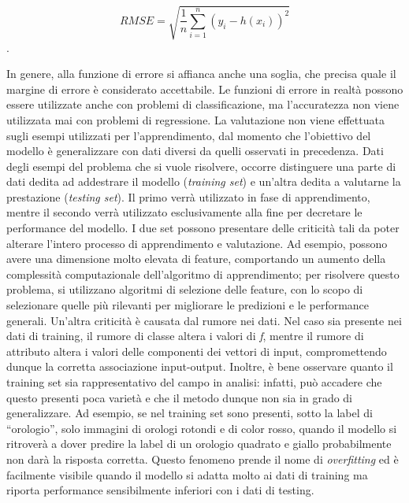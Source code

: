\documentclass[11pt,  oneside, openany]{book}
\begin{document}
$$RMSE = \sqrt{\frac{1}{n}\sum_{i=1}^{n}(y_{i} - h(x_{i}))^{2}}$$. 

In genere, alla funzione di errore si affianca anche una soglia, che precisa quale il margine di errore è considerato accettabile. Le funzioni di errore in realtà  possono essere utilizzate anche con problemi di classificazione, ma l'accuratezza non viene utilizzata mai con problemi di regressione. 
La valutazione non viene effettuata sugli esempi utilizzati per l'apprendimento, dal momento che l'obiettivo del modello è generalizzare con dati diversi da quelli osservati in precedenza. Dati degli esempi del problema che si vuole risolvere, occorre distinguere una parte di dati dedita ad addestrare il modello (\textit{training set}) e un'altra dedita a valutarne la prestazione (\textit{testing set}). Il primo verrà utilizzato in fase di apprendimento, mentre il secondo verrà utilizzato esclusivamente alla fine per decretare le performance del modello. I due set possono presentare delle criticità tali da poter alterare l'intero processo di apprendimento e valutazione. Ad esempio, possono avere una dimensione molto elevata di feature, comportando un aumento della complessità computazionale dell'algoritmo di apprendimento; per risolvere questo problema, si utilizzano algoritmi di selezione delle feature, con lo scopo di selezionare quelle più rilevanti per migliorare le predizioni e le performance generali. Un'altra criticità è causata dal rumore nei dati. Nel caso sia presente nei dati di training, il rumore di classe altera i valori di \textit{f}, mentre il rumore di attributo altera i valori delle componenti dei vettori di input, compromettendo dunque la corretta associazione input-output. Inoltre, è bene osservare quanto il training set sia rappresentativo del campo in analisi: infatti, può accadere che questo presenti poca varietà e che il metodo dunque non sia in grado di generalizzare. Ad esempio, se nel training set sono presenti, sotto la label di ``orologio'', solo immagini di orologi rotondi e di color rosso, quando il modello si ritroverà a dover predire la label di un orologio quadrato e giallo probabilmente non darà la risposta corretta. Questo fenomeno prende il nome di \textit {overfitting} ed è facilmente visibile quando il modello si adatta molto ai dati di training ma riporta performance sensibilmente inferiori con i dati di testing. 
\end{document}
